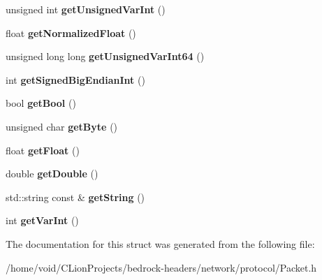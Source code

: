 \begin{DoxyCompactItemize}
unsigned int {\bfseries get\+Unsigned\+Var\+Int} ()
\item 
\mbox{\label{struct_read_only_binary_stream_a8fdd900673e467ee62c6d7803bb6cb4b}} 
float {\bfseries get\+Normalized\+Float} ()
\item 
\mbox{\label{struct_read_only_binary_stream_aa49c6199572d7285a1cb607dfdcdcd91}} 
unsigned long long {\bfseries get\+Unsigned\+Var\+Int64} ()
\item 
\mbox{\label{struct_read_only_binary_stream_a99385d55d0f522deb507b34e4fcf4eaf}} 
int {\bfseries get\+Signed\+Big\+Endian\+Int} ()
\item 
\mbox{\label{struct_read_only_binary_stream_a634f16b5f27a49f2a6e7d717292210e8}} 
bool {\bfseries get\+Bool} ()
\item 
\mbox{\label{struct_read_only_binary_stream_a27531222e0b00a5fca51ffa2e1c05eef}} 
unsigned char {\bfseries get\+Byte} ()
\item 
\mbox{\label{struct_read_only_binary_stream_a89c74b0a7f274bf80b10d6fda95d5656}} 
float {\bfseries get\+Float} ()
\item 
\mbox{\label{struct_read_only_binary_stream_a82856327ab9b7b998e3b1173ffa2e154}} 
double {\bfseries get\+Double} ()
\item 
\mbox{\label{struct_read_only_binary_stream_aec8f656f37e0e09649792a1e0b67d470}} 
std\+::string const  \& {\bfseries get\+String} ()
\item 
\mbox{\label{struct_read_only_binary_stream_a7ea15f18c351bfe7e35918f3c1fa8c75}} 
int {\bfseries get\+Var\+Int} ()
\end{DoxyCompactItemize}


The documentation for this struct was generated from the following file\+:\begin{DoxyCompactItemize}
\item 
/home/void/\+C\+Lion\+Projects/bedrock-\/headers/network/protocol/Packet.\+h\end{DoxyCompactItemize}
